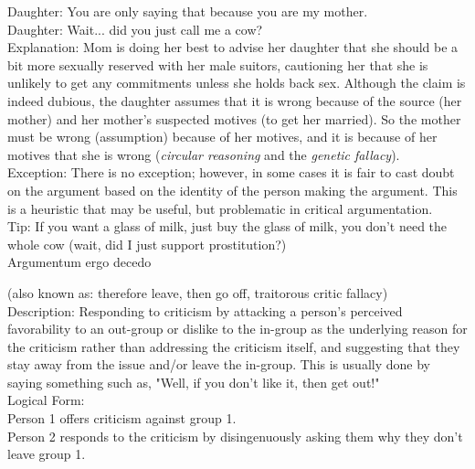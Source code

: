 \documentclass[a4paper,12pt,single,pdftex]{scrartcl}
\begin{document}
    
      Daughter: You are only saying that because you are my mother.
    \\

    
      Daughter: Wait... did you just call me a cow?
    \\

    
      Explanation: Mom is doing her best to advise her daughter that she should be a bit more sexually reserved with her male suitors, cautioning her that she is unlikely to get any commitments unless she holds back sex. Although the claim is indeed dubious, the daughter assumes that it is wrong because of the source (her mother) and her mother's suspected motives (to get her married). So the mother must be wrong (assumption) because of her motives, and it is because of her motives that she is wrong ({\it circular reasoning} and the {\it genetic fallacy}).
    \\

    
      Exception: There is no exception; however, in some cases it is fair to cast doubt on the argument based on the identity of the person making the argument. This is a heuristic that may be useful, but problematic in critical argumentation.
    \\

    
      Tip: If you want a glass of milk, just buy the glass of milk, you don't need the whole cow (wait, did I just support prostitution?)
    \\

  

Argumentum ergo decedo
    
      (also known as: therefore leave, then go off, traitorous critic fallacy)
    \\

  
    
      Description: Responding to criticism by attacking a person's perceived favorability to an out-group or dislike to the in-group as the underlying reason for the criticism rather than addressing the criticism itself, and suggesting that they stay away from the issue and/or leave the in-group. This is usually done by saying something such as, "Well, if you don't like it, then get out!"
    \\

    
      Logical Form:
    \\

    
      Person 1 offers criticism against group 1.
    \\

    
      Person 2 responds to the criticism by disingenuously asking them why they don't leave group 1.
    \\
\end{document}
